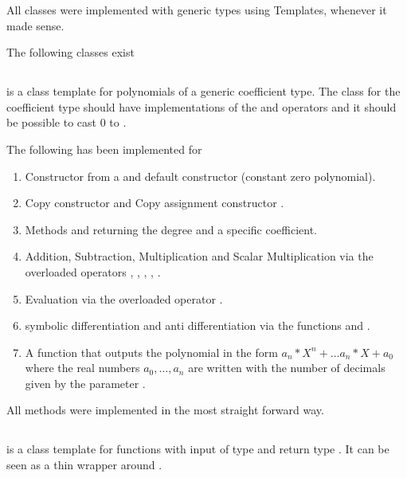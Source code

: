 		All classes were implemented with generic types using Templates, whenever it made sense.

		The following classes exist
		
		\subsection{\poly} 
			\textbf{} is a class template for polynomials of a generic coefficient type. 
			The class for the coefficient type should have implementations of the \code{*} and \code{+} operators
			and it should be possible to cast $0$ to .

			The following has been implemented for \poly
			\begin{enumerate}
				\item Constructor from a  and default constructor (constant zero polynomial).
				\item Copy constructor  and Copy assignment constructor .
				\item Methods  and  returning the degree and a specific coefficient.
				\item Addition, Subtraction, Multiplication and Scalar Multiplication via the overloaded operators \code{+}, \code{-}, 	\code{*}, \code{+=}, \code{*=}.
				\item Evaluation via the overloaded operator \code{()}.
				\item symbolic differentiation and anti differentiation via the functions  and .
				\item A function  that outputs the polynomial
				in the form $a_n*X^n+ \dots a_n*X + a_0$ where the real numbers $a_0, \dots, a_n$ are written with the number of decimals given by the parameter .
			\end{enumerate}
			All methods were implemented in the most straight forward way. 
		\subsection{\func}
			\textbf{} is a class template for functions with input 
			of type  and return type . 
      It can be seen as a thin wrapper around .
			
